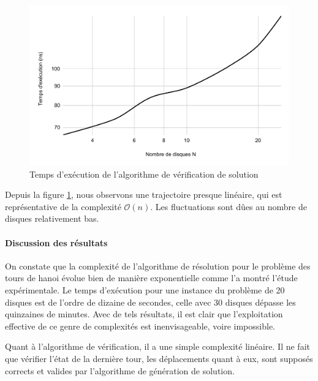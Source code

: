 \begin{figure}[H]
    \centering
        \includegraphics[scale=0.6]{./ressources/temps_execution_algo_verification.pdf}
        \caption{Temps d'exécution de l'algorithme de vérification de solution}
    \label{fig:temps_exec_algo_verification}
\end{figure}
\par
Depuis la figure \ref{fig:temps_exec_algo_verification}, nous observons une trajectoire presque linéaire, qui est représentative de la complexité $\mathcal{O}(n)$. Les fluctuations sont dûes au nombre de disques relativement bas.

\paragraph{Discussion des résultats}
On constate que la complexité de l'algorithme de résolution pour le problème des tours de hanoi évolue bien de manière exponentielle comme l'a montré l'étude expérimentale. Le temps d'exécution pour une instance du problème de 20 disques est de l'ordre de dizaine de secondes, celle avec 30 disques dépasse les quinzaines de minutes. Avec de tels résultats, il est clair que l'exploitation effective de ce genre de complexités est inenvisageable, voire impossible.
\par
Quant à l'algorithme de vérification, il a une simple complexité linéaire. Il ne fait que vérifier l'état de la dernière tour, les déplacements quant à eux, sont supposés corrects et valides par l'algorithme de génération de solution.
